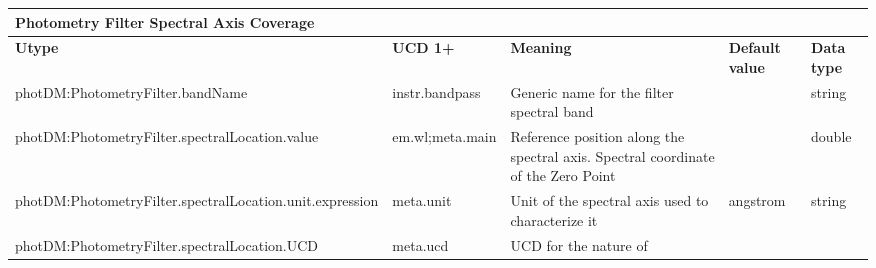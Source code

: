 \documentclass[11pt,a4paper]{ivoa}
\begin{document}
\begin{appendices}
\begin{table}[H]
\centering
\begin{adjustbox}{angle=90}
\begin{tabular}{p{5in}p{0.87in}p{2in}p{0.4in}p{0.25in}}
\multicolumn{5}{p{\dimexpr6.59in+8\tabcolsep\relax}}{\centering 
{\fontsize{10pt}{12.0pt}\selectfont \textbf{Photometry Filter Spectral Axis Coverage}}} \\
\hline
\multicolumn{1}{p{5in}}{{\fontsize{8pt}{8pt}\selectfont \textbf{Utype}}} &
\multicolumn{1}{p{0.87in}}{{\fontsize{8pt}{8pt}\selectfont \textbf{UCD 1+}}} &
\multicolumn{1}{p{2in}}{{\fontsize{8pt}{8pt}\selectfont \textbf{Meaning}}} &
\multicolumn{1}{p{0.74in}}{{\fontsize{8pt}{8pt}\selectfont \textbf{Default value}}} &
\multicolumn{1}{p{0.35in}}{{\fontsize{8pt}{8pt}\selectfont \textbf{Data type}}} \\
\hline
\multicolumn{1}{p{5in}}{{\fontsize{8pt}{8pt}\selectfont photDM:PhotometryFilter.bandName}} &
\multicolumn{1}{p{0.87in}}{{\fontsize{8pt}{8pt}\selectfont instr.bandpass }} &
\multicolumn{1}{p{2in}}{{\fontsize{8pt}{8pt}\selectfont Generic name for the 
filter spectral band}} &
\multicolumn{1}{p{0.74in}}{} &
\multicolumn{1}{p{0.35in}}{{\fontsize{8pt}{8pt}\selectfont string}} \\
\hline
\multicolumn{1}{p{5in}}{{\fontsize{8pt}{8pt}
\selectfont photDM:PhotometryFilter.spectralLocation.value}} &
\multicolumn{1}{p{0.87in}}{{\fontsize{8pt}{8pt}\selectfont em.wl;meta.main }} &
\multicolumn{1}{p{2in}}{{\fontsize{8pt}{8pt}\selectfont Reference position along the 
spectral axis. Spectral coordinate of the Zero Point }} &
\multicolumn{1}{p{0.74in}}{} &
\multicolumn{1}{p{0.35in}}{{\fontsize{8pt}{8pt}\selectfont double}} \\
\hline
\multicolumn{1}{p{5in}}{{\fontsize{8pt}{8pt}
\selectfont photDM:PhotometryFilter.spectralLocation.unit.expression}} &
\multicolumn{1}{p{0.87in}}{{\fontsize{8pt}{8pt}\selectfont meta.unit }} &
\multicolumn{1}{p{2in}}{{\fontsize{8pt}{8pt}\selectfont Unit of the spectral axis used 
to characterize it}} &
\multicolumn{1}{p{0.74in}}{{\fontsize{8pt}{8pt}\selectfont angstrom}} &
\multicolumn{1}{p{0.35in}}{{\fontsize{8pt}{8pt}\selectfont string}} \\
\hline
\multicolumn{1}{p{5in}}{{\fontsize{8pt}{8pt}
\selectfont photDM:PhotometryFilter.spectralLocation.UCD}} &
\multicolumn{1}{p{0.87in}}{{\fontsize{8pt}{8pt}\selectfont meta.ucd }} &
\multicolumn{1}{p{2in}}{{\fontsize{8pt}{8pt}\selectfont UCD for the nature of 
}}
\end{tabular}
\end{adjustbox}
\end{table}
\end{appendices}
\end{document}
